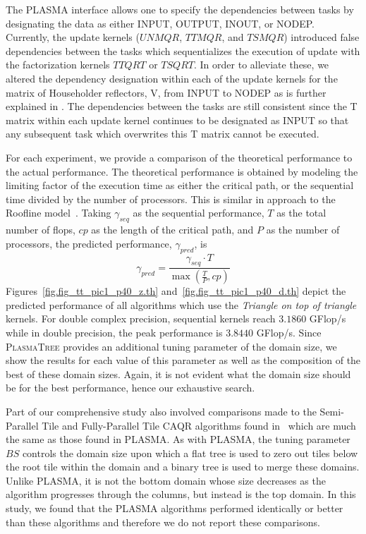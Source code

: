 \documentclass[a4paper,twopages]{article}
\newcommand{\TSQRT}{\ensuremath{\mathit{TSQRT}}\xspace}
\newcommand{\UNMQR}{\ensuremath{\mathit{UNMQR}}\xspace}
\newcommand{\TSMQR}{\ensuremath{\mathit{TSMQR}}\xspace}
\newcommand{\TTQRT}{\ensuremath{\mathit{TTQRT}}\xspace}
\newcommand{\TTMQR}{\ensuremath{\mathit{TTMQR}}\xspace}
\newcommand{\BS}{\ensuremath{\mathit{BS}}\xspace}
\newcommand{\PT}{\textsc{PlasmaTree}\xspace}
\begin{document}
The PLASMA interface allows one to specify the dependencies between tasks by
designating the data as either INPUT, OUTPUT, INOUT, or NODEP.  Currently,
the update kernels (\UNMQR, \TTMQR, and
\TSMQR) introduced false dependencies between the tasks which sequentializes
the execution of update with the factorization kernels \TTQRT or \TSQRT.  In
order to alleviate these, we altered the dependency designation within each of
the update kernels for the matrix of Householder reflectors, V, from INPUT to
NODEP as is further explained in \cite{CPE:CPE1467}.  The dependencies between
the tasks are still consistent since the T matrix within each update kernel
continues to be designated as INPUT so that any subsequent task which
overwrites this T matrix cannot be executed.

For each experiment, we provide a comparison of the theoretical performance to
the actual performance.  The theoretical performance is obtained by modeling
the limiting factor of the execution time as either the critical path, or the sequential time
divided by the number of processors.
This is similar in approach to the Roofline
model~\cite{Williams:2009:RIV:1498765.1498785}.  Taking $\gamma_{seq}$ as the
sequential performance, $T$ as the total number of flops, $cp$ as the length of
the critical path, and $P$ as the number of processors, the predicted
performance, $\gamma_{pred}$, is
\[ \gamma_{pred} = \frac{\gamma_{seq} \cdot T}{\max \left( \frac{T}{P}, cp \right)} \]
Figures~\ref{fig.fig_tt_pic1_p40_z.th} and~\ref{fig.fig_tt_pic1_p40_d.th} depict
the predicted performance of all algorithms which use the \emph{Triangle on top
of triangle} kernels.  For double complex precision, sequential kernels reach
$3.1860$ GFlop/s while in double precision, the peak performance is $3.8440$
GFlop/s.  Since \PT provides an additional tuning parameter of the domain size,
we show the results for each value of this parameter as well as the composition
of the best of these domain sizes. Again, it is not evident what the domain size
should be for the best performance, hence our exhaustive search.

Part of our comprehensive study also involved comparisons made to the
Semi-Parallel Tile and Fully-Parallel Tile CAQR algorithms found
in~\cite{Hadri_enhancingparallelism} which are much the same as those found in
PLASMA.  As with PLASMA, the tuning parameter $\BS$ controls the domain size
upon which a flat tree is used to zero out tiles below the root tile within the
domain and a binary tree is used to merge these domains.  Unlike PLASMA, it is
not the bottom domain whose size decreases as the algorithm progresses through
the columns, but instead is the top domain.  In this study, we found that the
PLASMA algorithms performed identically or better than these algorithms and
therefore we do not report these comparisons.
\end{document}
